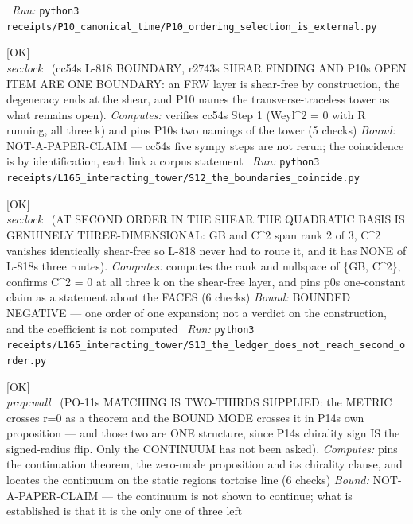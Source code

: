 \begin{description}
\ \emph{Run:} \texttt{python3 receipts/P10\_canonical\_time/P10\_ordering\_selection\_is\_external.py}
\item[\label{rcpt:S12_the_boundaries_coincide}\texttt{S12\_the\_boundaries\_coincide}]\hfill\textsf{[OK]}\\
\textit{sec:lock} \ (cc54s L-818 BOUNDARY, r2743s SHEAR FINDING AND P10s OPEN ITEM ARE ONE BOUNDARY: an FRW layer is shear-free by construction, the degeneracy ends at the shear, and P10 names the transverse-traceless tower as what remains open). 
\emph{Computes:} verifies cc54s Step 1 (Weyl\textasciicircum{}2 = 0 with R running, all three k) and pins P10s two namings of the tower (5 checks)
 \emph{Bound:} NOT-A-PAPER-CLAIM --- cc54s five sympy steps are not rerun; the coincidence is by identification, each link a corpus statement
\ \emph{Run:} \texttt{python3 receipts/L165\_interacting\_tower/S12\_the\_boundaries\_coincide.py}
\item[\label{rcpt:S13_the_ledger_does_not_reach_second_order}\texttt{S13\_the\_ledger\_does\_not\_reach\_second\_order}]\hfill\textsf{[OK]}\\
\textit{sec:lock} \ (AT SECOND ORDER IN THE SHEAR THE QUADRATIC BASIS IS GENUINELY THREE-DIMENSIONAL: GB and C\textasciicircum{}2 span rank 2 of 3, C\textasciicircum{}2 vanishes identically shear-free so L-818 never had to route it, and it has NONE of L-818s three routes). 
\emph{Computes:} computes the rank and nullspace of \{GB, C\textasciicircum{}2\}, confirms C\textasciicircum{}2 = 0 at all three k on the shear-free layer, and pins p0s one-constant claim as a statement about the FACES (6 checks)
 \emph{Bound:} BOUNDED NEGATIVE --- one order of one expansion; not a verdict on the construction, and the coefficient is not computed
\ \emph{Run:} \texttt{python3 receipts/L165\_interacting\_tower/S13\_the\_ledger\_does\_not\_reach\_second\_order.py}
\item[\label{rcpt:B36_two_of_three_crossings_are_supplied}\texttt{B36\_two\_of\_three\_crossings\_are\_supplied}]\hfill\textsf{[OK]}\\
\textit{prop:wall} \ (PO-11s MATCHING IS TWO-THIRDS SUPPLIED: the METRIC crosses r=0 as a theorem and the BOUND MODE crosses it in P14s own proposition --- and those two are ONE structure, since P14s chirality sign IS the signed-radius flip. Only the CONTINUUM has not been asked). 
\emph{Computes:} pins the continuation theorem, the zero-mode proposition and its chirality clause, and locates the continuum on the static regions tortoise line (6 checks)
 \emph{Bound:} NOT-A-PAPER-CLAIM --- the continuum is not shown to continue; what is established is that it is the only one of three left

\end{description}
